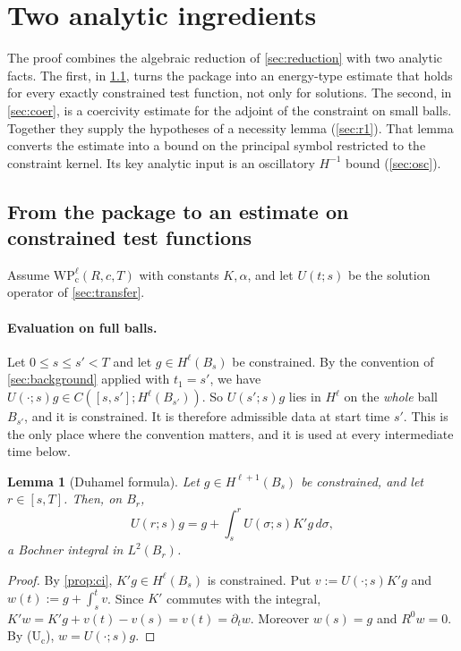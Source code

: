 \documentclass[11pt]{article}
\theoremstyle{plain}
\newtheorem{lemma}[theorem]{Lemma}
\theoremstyle{definition}
\theoremstyle{remark}
\newcommand{\WP}{\mathrm{WP}}
\begin{document}
\section{Two analytic ingredients}\label{sec:analysis}

The proof combines the algebraic reduction of \cref{sec:reduction} with two analytic facts. The first, in \cref{sec:wh}, turns the package into an energy-type estimate that holds for every exactly constrained test function, not only for solutions. The second, in \cref{sec:coer}, is a coercivity estimate for the adjoint of the constraint on small balls. Together they supply the hypotheses of a necessity lemma (\cref{sec:r1}). That lemma converts the estimate into a bound on the principal symbol restricted to the constraint kernel. Its key analytic input is an oscillatory $H^{-1}$ bound (\cref{sec:osc}).

\subsection{From the package to an estimate on constrained test functions}\label{sec:wh}

Assume $\WP_{\mathrm c}^\ell(R,c,T)$ with constants $K,\alpha$, and let $U(t;s)$ be the solution operator of \cref{sec:transfer}.

\paragraph{Evaluation on full balls.}
Let $0 \le s \le s' < T$ and let $g \in H^\ell(B_s)$ be constrained. By the convention of \cref{sec:background} applied with $t_1 = s'$, we have $U(\cdot;s)g \in C([s,s'];H^\ell(B_{s'}))$. So $U(s';s)g$ lies in $H^\ell$ on the \emph{whole} ball $B_{s'}$, and it is constrained. It is therefore admissible data at start time $s'$. This is the only place where the convention matters, and it is used at every intermediate time below.

\begin{lemma}[Duhamel formula]\label{lem:duhamel}
Let $g \in H^{\ell+1}(B_s)$ be constrained, and let $r \in [s,T]$. Then, on $B_r$,
\[
  U(r;s)g = g + \int_s^r U(\sigma;s)K'g\,d\sigma ,
\]
a Bochner integral in $L^2(B_r)$.
\end{lemma}

\begin{proof}
By \cref{prop:ci}, $K'g \in H^\ell(B_s)$ is constrained. Put $v := U(\cdot;s)K'g$ and $w(t) := g + \int_s^t v$. Since $K'$ commutes with the integral, $K'w = K'g + v(t) - v(s) = v(t) = \partial_tw$. Moreover $w(s) = g$ and $R^0w = 0$. By (U$_{\mathrm c}$), $w = U(\cdot;s)g$.
\end{proof}
\end{document}
